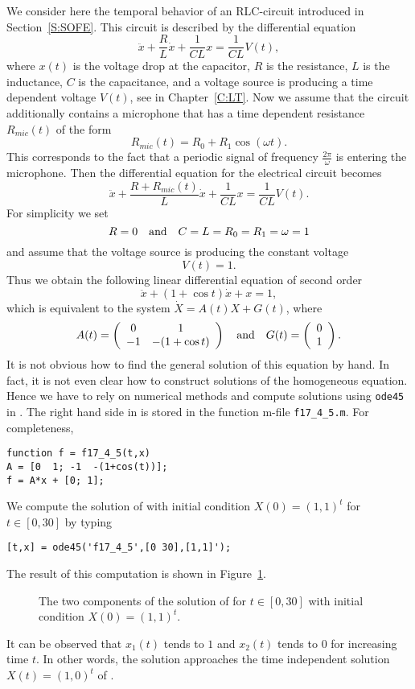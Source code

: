 \documentclass{ximera}
\begin{document}
We consider here the temporal behavior of an RLC-circuit introduced in 
Section~\ref{S:SOFE}.  This circuit is described by the differential equation
\[
\ddot x + \frac{R}{L}\dot x +
\frac{1}{CL}x = \frac{1}{CL}V(t),
\]
where $x(t)$ is the voltage drop at the capacitor,
$R$ is the resistance, $L$ is the inductance,
$C$ is the capacitance, and a voltage source 
is producing a time 
dependent voltage $V(t)$, see  in Chapter~\ref{C:LT}.
Now we assume that the circuit additionally
contains a microphone that has a time dependent 
resistance $R_{mic}(t)$ of the form
\[
R_{mic}(t) = R_0 + R_1\cos(\omega t).
\]
This corresponds to the fact that a periodic signal of 
frequency 
$\frac{2\pi}{\omega}$ is entering the microphone.  Then
the differential equation for the electrical circuit becomes
\begin{equation}
\label{E:RCLMcir}
\ddot x + \frac{R+R_{mic}(t)}{L}\dot x +
\frac{1}{CL}x = \frac{1}{CL}V(t).
\end{equation}
For simplicity we set
\[
R=0 \quad\mbox{and}\quad C=L=R_0 = R_1 = \omega = 1
\]
and assume that the voltage source is producing the constant voltage
\[
V(t) = 1.
\]
Thus we obtain the following linear differential equation of second order
\[
\ddot x + (1+\cos t)\dot x + x = 1,
\]
which is equivalent to the system $\dot X= A(t)X + G(t)$, where
\begin{equation*} \label{E:RCLM}
A(t) = \left( \begin{array}{cc}0 & 1\\-1 & -(1+\cos t)\end{array}\right)
\quad\mbox{and}\quad G(t) = \left(\begin{array}{r} 0 \\ 1\end{array}\right).
\end{equation*}
It is not obvious how to find the general solution 
of this equation by hand.
In fact, it is not even clear how to construct solutions of the
homogeneous equation.  Hence we have to rely on numerical methods
and compute solutions using {\tt ode45} 
in \Matlabp.  The right hand
side in  is stored in the function m-file {\tt f17\_4\_5.m}.
For completeness,
\begin{verbatim}
function f = f17_4_5(t,x)
A = [0  1; -1  -(1+cos(t))];
f = A*x + [0; 1];
\end{verbatim}
We compute the solution of  with initial condition $X(0)=(1,1)^t$
for $t\in[0,30]$ by typing
\begin{verbatim}
[t,x] = ode45('f17_4_5',[0 30],[1,1]');
\end{verbatim}
The result of this computation is shown in Figure~\ref{Fig:micro1}.
\begin{figure}[htb]
 \centerline{%
	   }
           \caption{The two components of the solution of 
	   \protect{} for $t\in[0,30]$ with initial
	   condition $X(0)=(1,1)^t$.}
           \label{Fig:micro1}
\end{figure}
It can be observed that $x_1(t)$ tends to $1$ and $x_2(t)$ tends to
$0$ for increasing time $t$.  In other words, the solution approaches the 
time independent solution $X(t)=(1,0)^t$ of .
\end{document}
